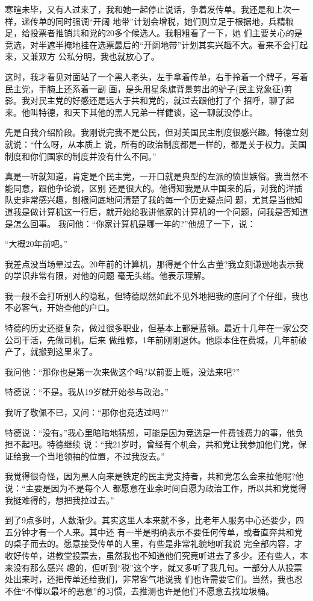 ﻿\documentclass[11pt]{article}
\begin{document}
寒暄未毕，又有人过来了，我和她一起停止说话，争着发传单。我还是和上次一样，递传单的同时强调``开阔
地带''计划会增税，她们则立足于根据地，兵精粮足，给投票者推销共和党的20多个候选人。我粗粗看了一下，她
们主要关心的是竞选，对半遮半掩地挂在选票最后的``开阔地带''计划其实兴趣不大。看来不会打起来，又兼双方
公私分明，我也就放心了。

这时，我才看见对面站了一个黑人老头，左手拿着传单，右手拎着一个牌子，写着民主党，手腕上还系着一副
画，是头用星条旗背景剪出的驴子(民主党象征)剪影。我对民主党的好感还是远大于共和党的，就过去跟他打了个
招呼，聊了起来。他叫特德，和天下其他的黑人兄弟一样健谈，这一聊就没停止。

先是自我介绍阶段。我刚说完我不是公民，但对美国民主制度很感兴趣。特德立刻就说：``什么呀，从本质上
说，所有的政治制度都是一样的，都是关于权力。美国制度和你们国家的制度并没有什么不同。''

真是一听就知道，肯定是个民主党，一开口就是典型的左派的愤世嫉俗。我当然不能同意，跟他争论说，区别
还是很大的。他得知我是从中国来的后，对我的洋插队史非常感兴趣，刨根问底地问清楚了我的每一个历史疑点问
题，尤其是当他知道我是做计算机这一行后，就开始给我讲他家的计算机的一个问题，问我是否知道是怎么回事。
我问他：``你家计算机是哪一年的?''他想了一下，说：

``大概20年前吧。''

我差点没当场晕过去。20年前的计算机，那得是个什么古董?我立刻谦逊地表示我的学识非常有限，对他的问题
毫无头绪。他表示理解。

我一般不会打听别人的隐私，但特德既然如此不见外地把我的底问了个仔细，我也不必客气，开始查他的户口。

特德的历史还挺复杂，做过很多职业，但基本上都是蓝领。最近十几年在一家公交公司干活，先做司机，后来
做维修，1年前刚刚退休。他原本住在费城，几年前破产了，就搬到这里来了。

我问他：``那你也是第一次来做这个吗?以前要上班，没法来吧?''

特德说：``不是。我从19岁就开始参与政治。''

我听了敬佩不已，又问：``那你也竞选过吗?''

特德说：``没有。''我心里暗暗地猜想，可能是因为竞选是一件费钱费力的事，他负担不起吧。特德继续
说：``我21岁时，曾经有个机会，共和党让我参加他们党，保证给我一个当地领袖的位置，不过我没去。''

我觉得很奇怪，因为黑人向来是铁定的民主党支持者，共和党怎么会来拉他呢?他说：``主要是因为不是每个人
都愿意在业余时间自愿为政治工作，所以共和党觉得我挺难得的，想把我拉过去。''

到了9点多时，人数渐少。其实这里人本来就不多，比老年人服务中心还要少，四五分钟才有一个人来。其中还
有一半是明确表示不要任何传单，或者直奔共和党的桌子而去的。愿意接受传单的人里，有些是非常礼貌地听我说
完全部内容，才收好传单，进教堂投票去，虽然我也不知道他们究竟听进去了多少。还有些人，本来没有那么感兴
趣的，但听到``税''这个字，就又多听了我几句。一部分人从投票处出来时，还把传单还给我们，非常客气地说我
们也许需要它们。当然，我也忍不住``不惮以最坏的恶意''的习惯，去推测也许是他们不愿意去找垃圾桶。
\end{document}
